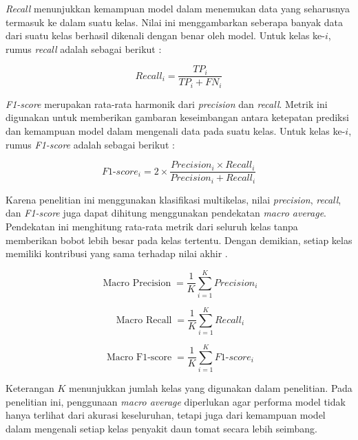 \begin{sectioncontent}
\begin{subsectioncontent}
        \textit{Recall} menunjukkan kemampuan model dalam menemukan data yang seharusnya termasuk ke dalam suatu kelas. Nilai ini menggambarkan seberapa banyak data dari suatu kelas berhasil dikenali dengan benar oleh model. Untuk kelas ke-$i$, rumus \textit{recall} adalah sebagai berikut \citep{powers2011evaluation,grandini2020metrics}:

        \begin{equation}
            Recall_{i} = \frac{TP_{i}}{TP_{i} + FN_{i}}
        \end{equation}

        \textit{F1-score} merupakan rata-rata harmonik dari \textit{precision} dan \textit{recall}. Metrik ini digunakan untuk memberikan gambaran keseimbangan antara ketepatan prediksi dan kemampuan model dalam mengenali data pada suatu kelas. Untuk kelas ke-$i$, rumus \textit{F1-score} adalah sebagai berikut \citep{powers2011evaluation,grandini2020metrics}:

        \begin{equation}
            F1\text{-}score_{i} = 2 \times \frac{Precision_{i} \times Recall_{i}}{Precision_{i} + Recall_{i}}
        \end{equation}

        Karena penelitian ini menggunakan klasifikasi multikelas, nilai \textit{precision}, \textit{recall}, dan \textit{F1-score} juga dapat dihitung menggunakan pendekatan \textit{macro average}. Pendekatan ini menghitung rata-rata metrik dari seluruh kelas tanpa memberikan bobot lebih besar pada kelas tertentu. Dengan demikian, setiap kelas memiliki kontribusi yang sama terhadap nilai akhir \citep{grandini2020metrics,opitz2019macro}.

        \begin{equation}
            \operatorname{Macro\ Precision} = \frac{1}{K} \sum_{i=1}^{K} Precision_{i}
        \end{equation}

        \begin{equation}
            \operatorname{Macro\ Recall} = \frac{1}{K} \sum_{i=1}^{K} Recall_{i}
        \end{equation}

        \begin{equation}
            \operatorname{Macro\ F1\text{-}score} = \frac{1}{K} \sum_{i=1}^{K} F1\text{-}score_{i}
        \end{equation}

        Keterangan $K$ menunjukkan jumlah kelas yang digunakan dalam penelitian. Pada penelitian ini, penggunaan \textit{macro average} diperlukan agar performa model tidak hanya terlihat dari akurasi keseluruhan, tetapi juga dari kemampuan model dalam mengenali setiap kelas penyakit daun tomat secara lebih seimbang.


\end{subsectioncontent}
\end{sectioncontent}
